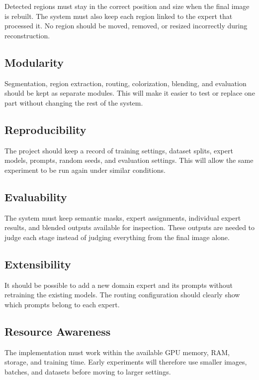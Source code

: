 \documentclass{FastFyp}
\begin{document}
Detected regions must stay in the correct position and size when the final image is rebuilt. The system must also keep each region linked to the expert that processed it. No region should be moved, removed, or resized incorrectly during reconstruction.

\subsection{Modularity}

Segmentation, region extraction, routing, colorization, blending, and evaluation should be kept as separate modules. This will make it easier to test or replace one part without changing the rest of the system.

\subsection{Reproducibility}

The project should keep a record of training settings, dataset splits, expert models, prompts, random seeds, and evaluation settings. This will allow the same experiment to be run again under similar conditions.

\subsection{Evaluability}

The system must keep semantic masks, expert assignments, individual expert results, and blended outputs available for inspection. These outputs are needed to judge each stage instead of judging everything from the final image alone.

\subsection{Extensibility}

It should be possible to add a new domain expert and its prompts without retraining the existing models. The routing configuration should clearly show which prompts belong to each expert.

\subsection{Resource Awareness}

The implementation must work within the available GPU memory, RAM, storage, and training time. Early experiments will therefore use smaller images, batches, and datasets before moving to larger settings.
\end{document}
